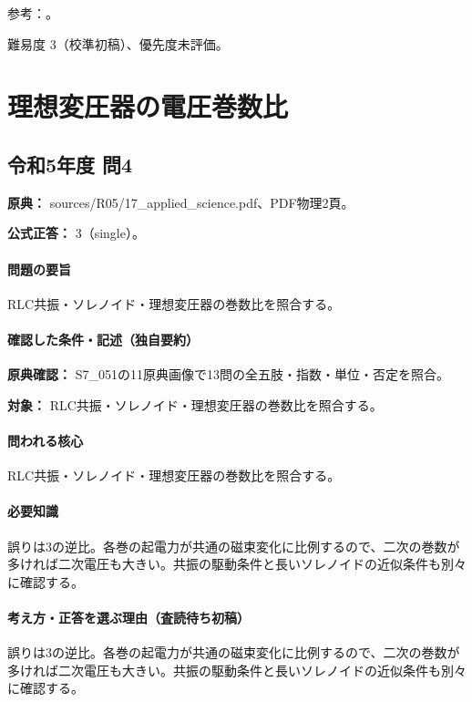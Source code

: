 \par 参考：\cite{em51_heating,em51_skin,em51_plasma}。

\par 難易度 3（校準初稿）、優先度未評価。

\section{理想変圧器の電圧巻数比}

\subsection{令和5年度 問4}
\label{q:r05-reg-applied-04}

\noindent\textbf{原典：} sources/R05/17\_applied\_science.pdf、PDF物理2頁。

\textbf{公式正答：} 3（single）。

\paragraph{問題の要旨} RLC共振・ソレノイド・理想変圧器の巻数比を照合する。

\paragraph{確認した条件・記述（独自要約）}\mbox{}\par

\noindent\textbf{原典確認：} S7\_051の11原典画像で13問の全五肢・指数・単位・否定を照合。\par

\noindent\textbf{対象：} RLC共振・ソレノイド・理想変圧器の巻数比を照合する。\par

\paragraph{問われる核心} RLC共振・ソレノイド・理想変圧器の巻数比を照合する。

\paragraph{必要知識} 誤りは3の逆比。各巻の起電力が共通の磁束変化に比例するので、二次の巻数が多ければ二次電圧も大きい。共振の駆動条件と長いソレノイドの近似条件も別々に確認する。

\paragraph{考え方・正答を選ぶ理由（査読待ち初稿）} 誤りは3の逆比。各巻の起電力が共通の磁束変化に比例するので、二次の巻数が多ければ二次電圧も大きい。共振の駆動条件と長いソレノイドの近似条件も別々に確認する。

